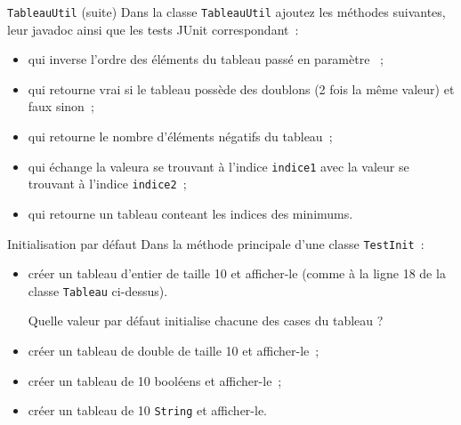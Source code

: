 \documentclass[a4paper,11pt]{article}
\begin{document}
	\begin{Exercice}{\texttt{TableauUtil} (suite)}	
		Dans la classe \texttt{TableauUtil} ajoutez les méthodes suivantes, leur
		 javadoc ainsi que les tests JUnit correspondant~:
		\begin{itemize}
			\item {} 
				qui inverse l'ordre des éléments  du tableau passé en paramètre ~;
			\item {} 
				qui retourne vrai si le tableau possède des doublons 
				(2 fois la même valeur) et faux sinon~;
			\item {} 
				qui retourne le nombre d'éléments négatifs du tableau~;
			\item {} 
				qui échange la valeura se trouvant à l'indice \texttt{indice1} 
				avec la valeur se trouvant à l'indice \texttt{indice2}~;
			\item {} 
				qui retourne un tableau conteant les indices des minimums.
		\end{itemize}
	\end{Exercice}
	
		
	\begin{Exercice}{Initialisation par défaut}	
		Dans la méthode principale d'une classe \texttt{TestInit}~:
		\begin{itemize}
			\item créer un tableau d'entier de taille 10 et afficher-le 
				(comme à  la ligne 18 de la classe \texttt{Tableau} ci-dessus). 
				
				Quelle valeur par défaut initialise chacune des cases du tableau ?
			\item créer un tableau de double de taille 10 et afficher-le~;
			\item créer un tableau de 10 booléens et afficher-le~;
			\item créer un tableau de 10 \texttt{String} et afficher-le.
		\end{itemize}
	\end{Exercice}
\end{document}
